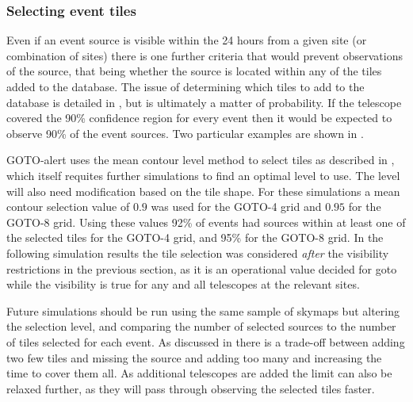 \begin{colsection}
\begin{colsection}
\clearpage


\subsubsection{Selecting event tiles}

Even if an event source is visible within the 24 hours from a given site (or combination of sites) there is one further criteria that would prevent observations of the source, that being whether the source is located within any of the tiles added to the database. The issue of determining which tiles to add to the database is detailed in , but is ultimately a matter of probability. If the telescope covered the 90\% confidence region for every event then it would be expected to observe 90\% of the event sources. Two particular examples are shown in .

GOTO-alert uses the mean contour level method to select tiles as described in , which itself requites further simulations to find an optimal level to use. The level will also need modification based on the tile shape. For these simulations a mean contour selection value of $0.9$ was used for the GOTO-4 grid and $0.95$ for the GOTO-8 grid. Using these values 92\% of events had sources within at least one of the selected tiles for the GOTO-4 grid, and 95\% for the GOTO-8 grid. In the following simulation results the tile selection was considered \textit{after} the visibility restrictions in the previous section, as it is an operational value decided for \gls{goto} while the visibility is true for any and all telescopes at the relevant sites.

Future simulations should be run using the same sample of skymaps but altering the selection level, and comparing the number of selected sources to the number of tiles selected for each event. As discussed in  there is a trade-off between adding two few tiles and missing the source and adding too many and increasing the time to cover them all. As additional telescopes are added the limit can also be relaxed further, as they will pass through observing the selected tiles faster.

\begin{figure}[p]


\end{figure}
\end{colsection}
\end{colsection}
